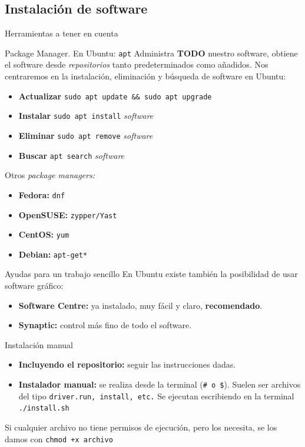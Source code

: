 \documentclass[12pt]{beamer}
\begin{document}
\subsection{Instalación de software}
\begin{frame}[allowframebreaks]{Herramientas a tener en cuenta}
	\begin{block}{Package Manager. En Ubuntu: \texttt{apt}}
		Administra \textbf{TODO} nuestro software, obtiene el software desde \textit{repositorios} tanto predeterminados como añadidos. Nos centraremos en la instalación, eliminación y búsqueda de software en Ubuntu:
		\begin{itemize}
			\item \textbf{Actualizar} \texttt{sudo apt update \&\& sudo apt upgrade}
			\item \textbf{Instalar} \texttt{sudo apt install} \textit{software}
			\item \textbf{Eliminar} \texttt{sudo apt remove} \textit{software}
			\item \textbf{Buscar} \texttt{apt search} \textit{software}
		\end{itemize}
	\end{block}
	Otros \textit{package managers:}
	\begin{itemize}
		\item \textbf{Fedora:} \texttt{dnf}
		\item \textbf{OpenSUSE:} \texttt{zypper/Yast}
		\item \textbf{CentOS:} \texttt{yum}
		\item \textbf{Debian:} \texttt{apt-get*}
	\end{itemize}
	\begin{block}{Ayudas para un trabajo sencillo}
		En Ubuntu existe también la posibilidad de usar software gráfico:
		\begin{itemize}
			\item \textbf{Software Centre:} ya instalado, muy fácil y claro, \textbf{recomendado}.
			\item \textbf{Synaptic:} control más fino de todo el software.
		\end{itemize}
	\end{block}
	\begin{block}{Instalación manual}
		\begin{itemize}
			\item \textbf{Incluyendo el repositorio:} seguir las instrucciones dadas.
			\item \textbf{Instalador manual:} se realiza desde la terminal (\texttt{\# o \$}). Suelen ser archivos del tipo \texttt{driver.run, install, etc.} Se ejecutan escribiendo en la terminal \texttt{./install.sh}
		\end{itemize}
	\end{block}
	Si cualquier archivo no tiene permisos de ejecución, pero los necesita, se los damos con  \texttt{chmod +x archivo}
\end{frame}
\end{document}
